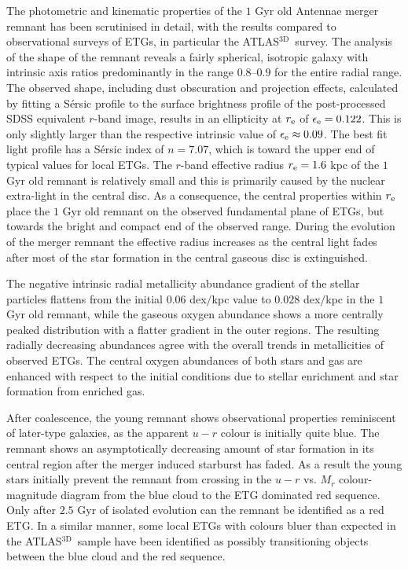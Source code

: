 \documentclass[a4paper,fleqn,usenatbib]{mnras}
\newcommand{\atlas}{\textsc{ATLAS$^\mathrm{3D}$}}
\begin{document}
The photometric and kinematic properties of the  $1$ Gyr old Antennae merger remnant has been scrutinised in detail, with the results 
compared to observational surveys of ETGs, in particular the \atlas\ survey. The analysis of the shape of the remnant reveals a fairly spherical, isotropic
galaxy with intrinsic axis ratios predominantly in the range $0.8$--$0.9$ for the entire radial range. 
The observed shape, including dust obscuration and projection effects, calculated by fitting a S\'{e}rsic profile to the
surface brightness profile of the post-processed SDSS equivalent $r$-band image, results in an ellipticity at $r_{\rm{e}}$
of $\epsilon_{\rm{e}}=0.122$. This is only slightly larger than the respective intrinsic value of $\epsilon_{\rm{e}}\approx 0.09$.  
The best fit light profile has a S\'{e}rsic index of $n=7.07$, which is toward the upper end of typical values for local ETGs.
The $r$-band effective radius $r_{\rm{e}}=1.6$ kpc of the $1$ Gyr old remnant is relatively small and this is primarily caused by
the nuclear extra-light in the central disc. As a consequence, the central properties within $r_{\rm{e}}$ place the $1$ Gyr old remnant on the observed fundamental plane of ETGs,
but towards the bright and compact end of the observed range. During the evolution of the merger remnant the effective radius increases
as the central light fades after most of the star formation in the central gaseous disc is extinguished. 

The negative intrinsic radial metallicity abundance gradient of the stellar particles
flattens from the initial $0.06$ dex$/$kpc value to $0.028$ dex$/$kpc in the $1$ Gyr old remnant, while the gaseous oxygen 
abundance shows a more centrally peaked 
distribution with a flatter gradient in the outer regions. The resulting radially decreasing abundances agree with the overall
 trends in metallicities of observed ETGs.
The central oxygen abundances of both stars and gas are enhanced with respect to the initial conditions due to stellar enrichment and star formation
from enriched gas.

After coalescence, the young remnant shows observational properties reminiscent of later-type
galaxies, as the apparent $u-r$ colour is initially quite blue. The remnant shows an asymptotically decreasing 
amount of star formation in its central region 
after the merger induced starburst has faded. As a result the young stars initially prevent the remnant
from crossing in the $u-r$ vs. $M_r$ colour-magnitude diagram from the blue cloud 
to the ETG dominated red sequence. Only after $2.5$ Gyr of 
isolated evolution can the remnant be identified as a red ETG.
In a similar manner, some local ETGs with colours bluer than expected in the \atlas\ sample have been
identified as possibly transitioning objects between the blue cloud and the red sequence.
\end{document}

